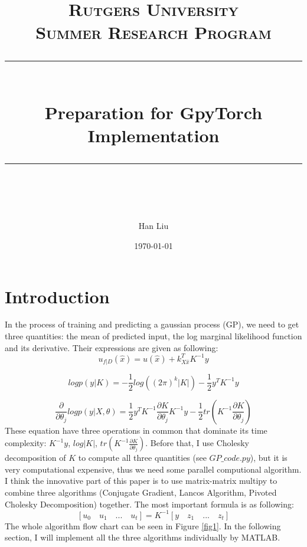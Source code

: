 \documentclass{article} %
\title{
\normalfont \normalsize 
\textsc{Rutgers University \\ 
Summer Research Program} \\
[10pt] 
\rule{\linewidth}{0.5pt} \\[6pt] 
\huge Preparation for GpyTorch Implementation  \\
\rule{\linewidth}{2pt}  \\[10pt]
}
\author{Han Liu}
\date{\normalsize \today}
\begin{document}
\maketitle



\section{Introduction}
In the process of training and predicting a gaussian process (GP), we need to get three quantities: the mean of predicted input, the log marginal likelihood function and its derivative. Their expressions are given as following:
\begin{equation}
u_{f|D}(\hat{x})=u(\hat{x})+k_{X\hat{x}}^{T}K^{-1}y
\end{equation}

\begin{equation}\label{eq1}
logp({y|K})=-\frac{1}{2}log((2\pi)^k|K|)-\frac{1}{2}y^T{K}^{-1}y
\end{equation}

\begin{equation}
\frac{\partial}{\partial \theta_j}logp(y|X,\theta)=\frac{1}{2}y^{T}K^{-1}\frac{\partial K}{\partial \theta_j}K^{-1}y-\frac{1}{2}tr(K^{-1}\frac{\partial K}{\partial \theta_j})
\end{equation}
These equation have three operations in common that dominate its time complexity: $K^{-1}y$, $log|K|$, $tr(K^{-1}\frac{\partial K}{\partial \theta_j})$. Before that, I use Cholesky decomposition of $K$ to compute all three quantities (see $GP\_code.py$), but it is very computational expensive, thus we need some parallel computional algorithm.\\
I think the innovative part of this paper is to use matrix-matrix multipy to combine three algorithms (Conjugate Gradient, Lancos Algorithm, Pivoted Cholesky Decomposition) together. The most important formula is as following:
\begin{equation}\label{equ1}
[u_0 \quad u_1 \quad ... \quad u_t]=K^{-1}[y \quad z_1 \quad ... \quad z_t]
\end{equation}
The whole algorithm flow chart can be seen in Figure \ref{fig1}. In the following section, I will implement all the three algorithms individually by MATLAB.
\end{document}
